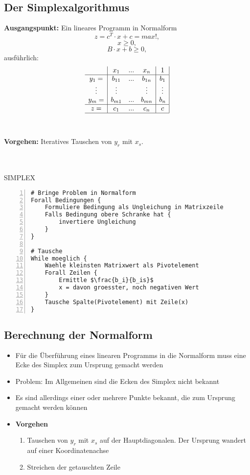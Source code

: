 \subsection{Der Simplexalgorithmus}
\textbf{Ausgangspunkt:} Ein lineares Programm in Normalform
\[z = c^T \cdot x + c = max!,\]
\[x \geq 0,\]
\[B \cdot x + b \geq 0,\]
ausführlich:
\[\begin{array}{c|ccc|c|}
	& x_1 & ... & x_n & 1 \\
	\hline
	y_1= & b_{11} & ... & b_{1n} & b_1 \\
	\vdots & \vdots & & \vdots & \vdots \\
	y_m= & b_{m1} & ... & b_{mn} & b_n \\
	\hline
	z= & c_1 & ... & c_n & c \\
	\hline
\end{array}\]
\\\\
\textbf{Vorgehen:} Iteratives Tauschen von \(y_r\) mit \(x_s\).
\\\\\\
\begin{minipage}{\textwidth}
SIMPLEX
\begin{lstlisting}[frame=single,numbers=left,mathescape]
# Bringe Problem in Normalform
Forall Bedingungen {
	Formuliere Bedingung als Ungleichung in Matrixzeile
	Falls Bedingung obere Schranke hat {
		invertiere Ungleichung
	}
}

# Tausche
While moeglich {
	Waehle kleinsten Matrixwert als Pivotelement
	Forall Zeilen {
		Ermittle $\frac{b_i}{b_is}$
		x = davon groesster, noch negativen Wert
	}
	Tausche Spalte(Pivotelement) mit Zeile(x)
}
\end{lstlisting}
\end{minipage}


\subsection{Berechnung der Normalform}
\begin{itemize}
	\item Für die Überführung eines linearen Programms in die Normalform muss eine Ecke des Simplex zum Ursprung gemacht werden
	\item Problem: Im Allgemeinen sind die Ecken des Simplex nicht bekannt
	\item Es sind allerdings einer oder mehrere Punkte bekannt, die zum Ursprung gemacht werden können
	\item \textbf{Vorgehen}
	\begin{enumerate}
		\item Tauschen von \(y_r\) mit \(x_s\) auf der Hauptdiagonalen. Der Ursprung wandert auf einer Koordinatenachse
		\item Streichen der getauschten Zeile
	\end{enumerate}
\end{itemize}


